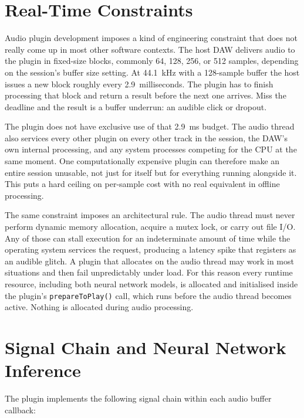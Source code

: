 \section{Real-Time Constraints}

Audio plugin development imposes a kind of engineering constraint that does not really come up in most other software contexts. The host DAW delivers audio to the plugin in fixed-size blocks, commonly 64, 128, 256, or 512 samples, depending on the session's buffer size setting. At 44.1~kHz with a 128-sample buffer the host issues a new block roughly every 2.9~milliseconds. The plugin has to finish processing that block and return a result before the next one arrives. Miss the deadline and the result is a buffer underrun: an audible click or dropout.

The plugin does not have exclusive use of that 2.9~ms budget. The audio thread also services every other plugin on every other track in the session, the DAW's own internal processing, and any system processes competing for the CPU at the same moment. One computationally expensive plugin can therefore make an entire session unusable, not just for itself but for everything running alongside it. This puts a hard ceiling on per-sample cost with no real equivalent in offline processing.

The same constraint imposes an architectural rule. The audio thread must never perform dynamic memory allocation, acquire a mutex lock, or carry out file I/O. Any of those can stall execution for an indeterminate amount of time while the operating system services the request, producing a latency spike that registers as an audible glitch. A plugin that allocates on the audio thread may work in most situations and then fail unpredictably under load. For this reason every runtime resource, including both neural network models, is allocated and initialised inside the plugin's \texttt{prepareToPlay()} call, which runs before the audio thread becomes active. Nothing is allocated during audio processing.

\section{Signal Chain and Neural Network Inference}

The plugin implements the following signal chain within each audio buffer callback:

